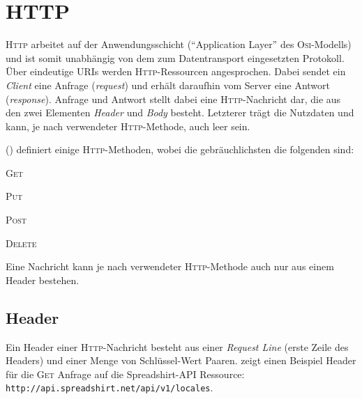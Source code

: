 \section{HTTP}
\label{sec:http}


\textsc{Http} arbeitet auf der Anwendungsschicht (\enquote{Application Layer} des \textsc{Osi}-Modells) und ist somit unabhängig von dem zum Datentransport eingesetzten Protokoll. 
Über eindeutige \glspl{URI} werden \textsc{Http}-Ressourcen angesprochen. Dabei sendet ein \emph{Client} eine Anfrage (\emph{request}) und erhält daraufhin vom Server eine Antwort (\emph{response}). Anfrage und Antwort stellt dabei eine \textsc{Http}-Nachricht dar, die aus den zwei Elementen \emph{Header} und \emph{Body} besteht. Letzterer trägt die Nutzdaten und kann, je nach verwendeter \textsc{Http}-Methode, auch leer sein.

 (\cite{rfc2616}) definiert einige \textsc{Http}-Methoden, wobei die gebräuchlichsten die folgenden sind:
\begin{compactitem}
    \item \textsc{Get}
    \item \textsc{Put}
    \item \textsc{Post}
    \item \textsc{Delete}
\end{compactitem}

Eine Nachricht kann je nach verwendeter \textsc{Http}-Methode auch nur aus einem Header bestehen.

\subsection{Header}
\label{sec:http-header}

Ein Header einer \textsc{Http}-Nachricht besteht aus einer \emph{Request Line} (erste Zeile des Headers) und einer Menge von Schlüssel-Wert Paaren.  zeigt einen Beispiel Header für die \textsc{Get} Anfrage auf die Spreadshirt-\gls{API} Ressource:
\texttt{http://api.spreadshirt.net/api/v1/locales}.

